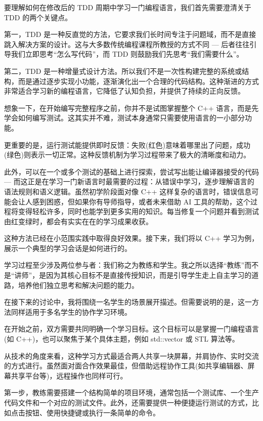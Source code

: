 要理解如何在修改后的 TDD 周期中学习一门编程语言，我们首先需要澄清关于 TDD 的两个关键点。

第一，TDD 是一种反直觉的方法，它要求我们长时间专注于问题域，而不是直接跳入解决方案的设计。这与大多数传统编程课程所教授的方式不同 --- 后者往往引导我们立即思考“怎么写代码”，而 TDD 则鼓励我们先思考“我们需要什么”。

第二，TDD 是一种增量式设计方法。所以我们不是一次性构建完整的系统或结构，而是通过逐步实现小功能，逐渐演化出一个合理的代码结构。这种渐进的方式非常适合学习新的编程语言，它降低了认知负担，并提供了持续的正向反馈。

想象一下，在开始编写完整程序之前，你并不是试图掌握整个 C++ 语言，而是先学会如何编写测试。这其实并不难，测试本身通常只需要使用语言的一小部分功能。

更重要的是，运行测试能提供即时反馈：失败(红色)意味着哪里出了问题，成功(绿色)则表示一切正常。这种反馈机制为学习过程带来了极大的清晰度和动力。

此外，可以在一个或多个测试的基础上进行探索，尝试写出能让编译器接受的代码 --- 而这正是在学习一门新语言时最需要的过程：从错误中学习，逐步理解语言的语法规则和语义逻辑。虽然初学阶段面对像 C++ 这样复杂的语言时，错误信息可能会让人感到困惑，但如果你有导师指导，或者未来借助 AI 工具的帮助，这个过程将变得轻松许多，同时也能学到更多实用的知识。每当修复一个问题并看到测试由红变绿时，都会有实实在在的学习成果收获。

这种方法已经在小范围实践中取得良好效果。接下来，我们将以 C++ 学习为例，展示一个典型的学习会话是如何进行的。


学习过程至少涉及两位参与者：我们称之为教练和学生。我之所以选择“教练”而不是“讲师”，是因为其核心目标不是直接传授知识，而是引导学生走上自主学习的道路，培养他们独立思考和解决问题的能力。

在接下来的讨论中，我将围绕一名学生的场景展开描述。但需要说明的是，这一方法同样适用于多名学生的协作学习环境。

在开始之前，双方需要共同明确一个学习目标。这个目标可以是掌握一门编程语言(如 C++)，也可以聚焦于某个具体主题，例如 std::vector 或 STL 算法等。

从技术的角度来看，这种学习方式最适合两人共享一块屏幕，并肩协作、实时交流的方式进行。虽然面对面合作效果最佳，但借助远程协作工具(如共享编辑器、屏幕共享平台等)，远程操作也同样可行。

第一步，教练需要搭建一个结构简单的项目环境，通常包括一个测试库、一个生产代码文件和一个对应的测试文件。此外，还需要提供一种便捷运行测试的方式，比如点击按钮、使用快捷键或执行一条简单的命令。

